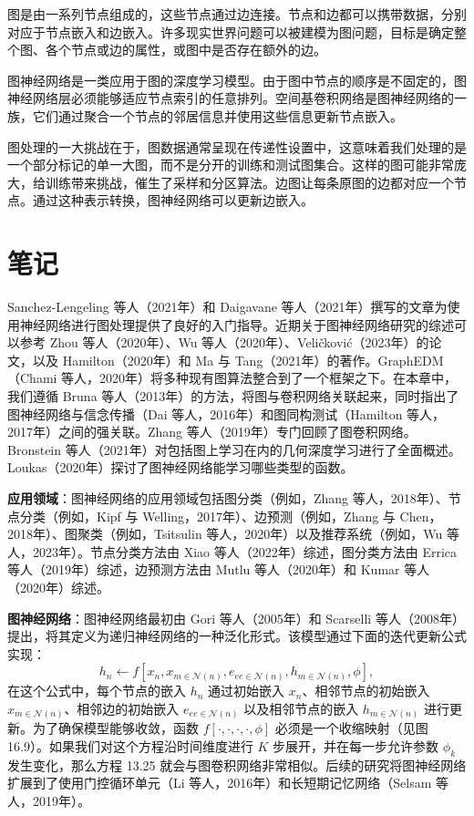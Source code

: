 图是由一系列节点组成的，这些节点通过边连接。节点和边都可以携带数据，分别对应于节点嵌入和边嵌入。许多现实世界问题可以被建模为图问题，目标是确定整个图、各个节点或边的属性，或图中是否存在额外的边。

图神经网络是一类应用于图的深度学习模型。由于图中节点的顺序是不固定的，图神经网络层必须能够适应节点索引的任意排列。空间基卷积网络是图神经网络的一族，它们通过聚合一个节点的邻居信息并使用这些信息更新节点嵌入。

图处理的一大挑战在于，图数据通常呈现在传递性设置中，这意味着我们处理的是一个部分标记的单一大图，而不是分开的训练和测试图集合。这样的图可能非常庞大，给训练带来挑战，催生了采样和分区算法。边图让每条原图的边都对应一个节点。通过这种表示转换，图神经网络可以更新边嵌入。

\section{笔记}
Sanchez-Lengeling 等人（2021年）和 Daigavane 等人（2021年）撰写的文章为使用神经网络进行图处理提供了良好的入门指导。近期关于图神经网络研究的综述可以参考 Zhou 等人（2020年）、Wu 等人（2020年）、Veličković（2023年）的论文，以及 Hamilton（2020年）和 Ma 与 Tang（2021年）的著作。GraphEDM（Chami 等人，2020年）将多种现有图算法整合到了一个框架之下。在本章中，我们遵循 Bruna 等人（2013年）的方法，将图与卷积网络关联起来，同时指出了图神经网络与信念传播（Dai 等人，2016年）和图同构测试（Hamilton 等人，2017年）之间的强关联。Zhang 等人（2019年）专门回顾了图卷积网络。Bronstein 等人（2021年）对包括图上学习在内的几何深度学习进行了全面概述。Loukas（2020年）探讨了图神经网络能学习哪些类型的函数。

\textbf{应用领域}：图神经网络的应用领域包括图分类（例如，Zhang 等人，2018年）、节点分类（例如，Kipf 与 Welling，2017年）、边预测（例如，Zhang 与 Chen，2018年）、图聚类（例如，Tsitsulin 等人，2020年）以及推荐系统（例如，Wu 等人，2023年）。节点分类方法由 Xiao 等人（2022年）综述，图分类方法由 Errica 等人（2019年）综述，边预测方法由 Mutlu 等人（2020年）和 Kumar 等人（2020年）综述。

\textbf{图神经网络}：图神经网络最初由 Gori 等人（2005年）和 Scarselli 等人（2008年）提出，将其定义为递归神经网络的一种泛化形式。该模型通过下面的迭代更新公式实现：
\begin{equation}
h_n \leftarrow f \left[ x_n, x_{m\in \mathcal{N}(n)}, e_{ee\in \mathcal{N}(n)}, h_{m\in \mathcal{N}(n)}, \phi \right], 
\end{equation}
在这个公式中，每个节点的嵌入 \(h_n\) 通过初始嵌入 \(x_n\)、相邻节点的初始嵌入 \(x_{m\in \mathcal{N}(n)}\)、相邻边的初始嵌入 \(e_{ee\in \mathcal{N}(n)}\) 以及相邻节点的嵌入 \(h_{m\in \mathcal{N}(n)}\) 进行更新。为了确保模型能够收敛，函数 \(f[\cdot, \cdot, \cdot, \cdot, \phi]\) 必须是一个收缩映射（见图 16.9）。如果我们对这个方程沿时间维度进行 \(K\) 步展开，并在每一步允许参数 \(\phi_k\) 发生变化，那么方程 13.25 就会与图卷积网络非常相似。后续的研究将图神经网络扩展到了使用门控循环单元（Li 等人，2016年）和长短期记忆网络（Selsam 等人，2019年）。

